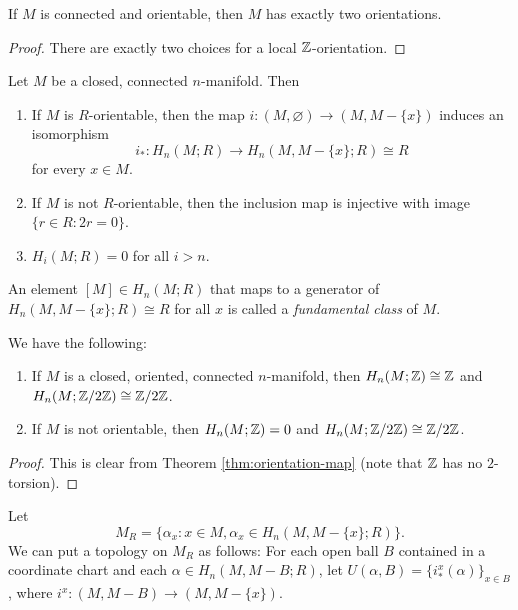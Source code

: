 \begin{corollary}
  If $M$ is connected and orientable,
  then $M$ has exactly two orientations.
\end{corollary}

\begin{proof}
  There are exactly two choices for a
  local $\mathbb{Z}$-orientation.
\end{proof}

\begin{theorem}\label{thm:orientation-map}
  Let $M$ be a closed, connected
  $n$-manifold. Then
  \begin{enumerate}
    \item If $M$ is $R$-orientable, then the
      map $i : (M, \varnothing) \to (M, M - \{x\})$
      induces an isomorphism
      \[
        i_* : H_n(M; R) \longrightarrow
        H_n(M, M - \{x\}; R) \cong R
      \]
      for every $x \in M$.
    \item If $M$ is not $R$-orientable, then
      the inclusion map is injective with
      image
      $\{r \in R : 2r = 0\}$.
    \item $H_i(M; R) = 0$ for all $i > n$.
  \end{enumerate}
\end{theorem}

\begin{definition}
  An element $[M] \in H_n(M; R)$ that maps
  to a generator of $H_n(M, M - \{x\}; R) \cong R$
  for all $x$ is called a \emph{fundamental class}
  of $M$.
\end{definition}

\begin{corollary}
  We have the following:
  \begin{enumerate}
    \item If $M$ is a closed, oriented, connected
      $n$-manifold, then
        $H_n(M; \mathbb{Z}) \cong \mathbb{Z}$
        and
        $H_n(M; \mathbb{Z} / 2\mathbb{Z}) \cong \mathbb{Z} / 2\mathbb{Z}$.
    \item If $M$ is not orientable, then
      $H_n(M; \mathbb{Z}) = 0$ and $H_n(M; \mathbb{Z} / 2\mathbb{Z}) \cong \mathbb{Z} / 2\mathbb{Z}$.
  \end{enumerate}
\end{corollary}

\begin{proof}
  This is clear from Theorem \ref{thm:orientation-map}
  (note that $\mathbb{Z}$ has no $2$-torsion).
\end{proof}

\begin{definition}
  Let
  \[
    M_R = \{\alpha_x : x \in M, \alpha_x \in H_n(M, M - \{x\}; R)\}.
  \]
  We can put a topology on $M_R$ as follows:
  For each open ball $B$ contained in a
  coordinate chart and each $\alpha \in H_n(M, M - B; R)$,
  let $U(\alpha, B) = \{i^x_*(\alpha)\}_{x \in B}$,
  where $i^x : (M, M - B) \to (M, M - \{x\})$.
\end{definition}

